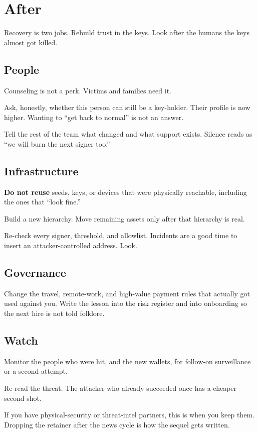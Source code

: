 \chapter{After}

Recovery is two jobs. Rebuild trust in the keys. Look
after the humans the keys almost got killed.

\section{People}

Counseling is not a perk. Victims and families need it.

Ask, honestly, whether this person can still be a
key-holder. Their profile is now higher. Wanting to
``get back to normal'' is not an answer.

Tell the rest of the team what changed and what support
exists. Silence reads as ``we will burn the next signer
too.''

\section{Infrastructure}

\textbf{Do not reuse} seeds, keys, or devices that were
physically reachable, including the ones that ``look
fine.''

Build a new hierarchy. Move remaining assets only after
that hierarchy is real.

Re-check every signer, threshold, and allowlist. Incidents
are a good time to insert an attacker-controlled address.
Look.

\section{Governance}

Change the travel, remote-work, and high-value payment
rules that actually got used against you. Write the
lesson into the risk register and into onboarding so the
next hire is not told folklore.

\section{Watch}

Monitor the people who were hit, and the new wallets, for
follow-on surveillance or a second attempt.

Re-read the threat. The attacker who already succeeded
once has a cheaper second shot.

If you have physical-security or threat-intel partners,
this is when you keep them. Dropping the retainer after
the news cycle is how the sequel gets written.
